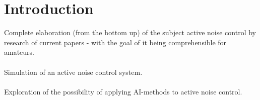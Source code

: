 \chapter{Introduction}
\label{chap:introduction}

Complete elaboration (from the bottom up) of the subject active noise control by research of current papers - with the goal of it being comprehensible for amateurs.
\\
\\
Simulation of an active noise control system.
\\
\\
Exploration of the possibility of applying AI-methods to active noise control.